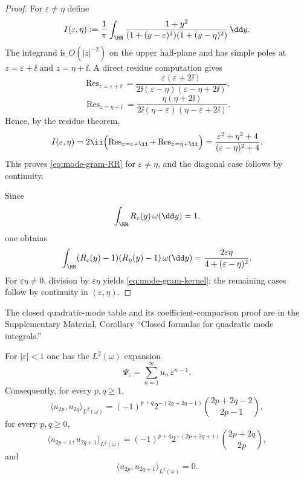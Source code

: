 \ifdefined\JFAArticleMain
{}
\else
\begin{proof}
For $\varepsilon\neq\eta$ define
\[
I(\varepsilon,\eta)
:=\frac{1}{\pi}\int_{\RR}
\frac{1+y^2}{(1+(y-\varepsilon)^2)(1+(y-\eta)^2)}\,\dd y.
\]
The integrand is $O(|z|^{-2})$ on the upper half-plane and has simple
poles at $z=\varepsilon+\ii$ and $z=\eta+\ii$.  A direct residue
computation gives
\[
\operatorname{Res}_{z=\varepsilon+\ii}
=\frac{\varepsilon(\varepsilon+2\ii)}
{2\ii(\varepsilon-\eta)(\varepsilon-\eta+2\ii)},
\]
\[
\operatorname{Res}_{z=\eta+\ii}
=\frac{\eta(\eta+2\ii)}
{2\ii(\eta-\varepsilon)(\eta-\varepsilon+2\ii)}.
\]
Hence, by the residue theorem,
\[
I(\varepsilon,\eta)
=2\ii\Bigl(
\operatorname{Res}_{z=\varepsilon+\ii}
+\operatorname{Res}_{z=\eta+\ii}
\Bigr)
=\frac{\varepsilon^2+\eta^2+4}{(\varepsilon-\eta)^2+4}.
\]
This proves \eqref{eq:mode-gram-RR} for $\varepsilon\neq\eta$, and the
diagonal case follows by continuity.

Since
\[
\int_{\RR}R_\varepsilon(y)\,\omega(\dd y)=1,
\]
one obtains
\[
\int_{\RR}(R_\varepsilon(y)-1)(R_\eta(y)-1)\,\omega(\dd y)
=\frac{2\varepsilon\eta}{4+(\varepsilon-\eta)^2}.
\]
For $\varepsilon\eta\neq 0$, division by $\varepsilon\eta$ yields
\eqref{eq:mode-gram-kernel}; the remaining cases follow by continuity in
$(\varepsilon,\eta)$.
\end{proof}
\fi

\ifdefined\JFAArticleMain
The closed quadratic-mode table and its coefficient-comparison proof are in
the Supplementary Material, Corollary ``Closed formulas for quadratic mode
integrals.''
\else
\begin{corollary}%
\label{cor:mode-quadratic-integrals}
For $|\varepsilon|<1$ one has the $L^2(\omega)$ expansion
\[
\Psi_\varepsilon
=\sum_{n=1}^{\infty}u_n\,\varepsilon^{n-1}.
\]
Consequently, for every $p,q\ge 1$,
\[
\langle u_{2p},u_{2q}\rangle_{L^2(\omega)}
=(-1)^{p+q}2^{-(2p+2q-1)}
\binom{2p+2q-2}{2p-1},
\]
for every $p,q\ge 0$,
\[
\langle u_{2p+1},u_{2q+1}\rangle_{L^2(\omega)}
=(-1)^{p+q}2^{-(2p+2q+1)}
\binom{2p+2q}{2p},
\]
and
\[
\langle u_{2p},u_{2q+1}\rangle_{L^2(\omega)}=0.
\]
\end{corollary}

